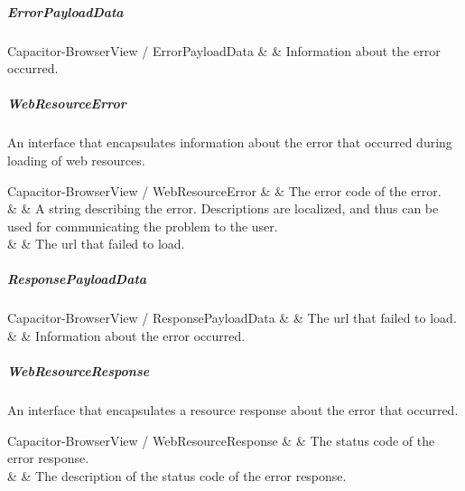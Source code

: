 
\newpage

\subparagraph{ErrorPayloadData}

\begin{interfacedesc}{Capacitor-BrowserView / ErrorPayloadData}
   &  & Information about the error occurred. \\ \hline
\end{interfacedesc}


\subparagraph{WebResourceError}

An interface that encapsulates information about the error that occurred during loading of web resources.

\begin{interfacedesc}{Capacitor-BrowserView / WebResourceError}
          &  & The error code of the error. \\ \hline
   &  & A string describing the error. Descriptions are localized, and thus can be used for communicating the problem to the user. \\ \hline
       &  & The \ac{url} that failed to load. \\ \hline
\end{interfacedesc}


\subparagraph{ResponsePayloadData}

\begin{interfacedesc}{Capacitor-BrowserView / ResponsePayloadData}
             &               & The \ac{url} that failed to load. \\ \hline
   &  & Information about the error occurred. \\ \hline
\end{interfacedesc}


\subparagraph{WebResourceResponse}

An interface that encapsulates a resource response about the error that occurred.

\begin{interfacedesc}{Capacitor-BrowserView / WebResourceResponse}
   &  & The status code of the error response. \\ \hline
     &  & The description of the status code of the error response. \\ \hline
\end{interfacedesc}

